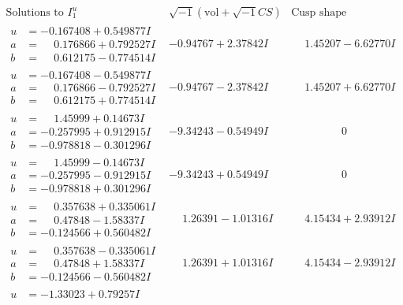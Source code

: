 \documentclass[1p]{elsarticle_modified}
\theoremstyle{definition}
\newcommand{\I}{\sqrt{-1}}
\begin{document}
$$\begin{array}{c|c|c}
\text{Solutions to }I^u_{1}& \I (\text{vol} + \sqrt{-1}CS) & \text{Cusp shape}\\
 \hline 
\begin{aligned}
u &= -0.167408 + 0.549877 I \\
a &= \phantom{-}0.176866 + 0.792527 I \\
b &= \phantom{-}0.612175 - 0.774514 I\end{aligned}
 & -0.94767 + 2.37842 I & \phantom{-}1.45207 - 6.62770 I \\ \hline\begin{aligned}
u &= -0.167408 - 0.549877 I \\
a &= \phantom{-}0.176866 - 0.792527 I \\
b &= \phantom{-}0.612175 + 0.774514 I\end{aligned}
 & -0.94767 - 2.37842 I & \phantom{-}1.45207 + 6.62770 I \\ \hline\begin{aligned}
u &= \phantom{-}1.45999 + 0.14673 I \\
a &= -0.257995 + 0.912915 I \\
b &= -0.978818 - 0.301296 I\end{aligned}
 & -9.34243 - 0.54949 I & \phantom{-0.000000 } 0 \\ \hline\begin{aligned}
u &= \phantom{-}1.45999 - 0.14673 I \\
a &= -0.257995 - 0.912915 I \\
b &= -0.978818 + 0.301296 I\end{aligned}
 & -9.34243 + 0.54949 I & \phantom{-0.000000 } 0 \\ \hline\begin{aligned}
u &= \phantom{-}0.357638 + 0.335061 I \\
a &= \phantom{-}0.47848 - 1.58337 I \\
b &= -0.124566 + 0.560482 I\end{aligned}
 & \phantom{-}1.26391 - 1.01316 I & \phantom{-}4.15434 + 2.93912 I \\ \hline\begin{aligned}
u &= \phantom{-}0.357638 - 0.335061 I \\
a &= \phantom{-}0.47848 + 1.58337 I \\
b &= -0.124566 - 0.560482 I\end{aligned}
 & \phantom{-}1.26391 + 1.01316 I & \phantom{-}4.15434 - 2.93912 I \\ \hline\begin{aligned}
u &= -1.33023 + 0.79257 I \\

\end{aligned}
\end{array}$$
\end{document}
